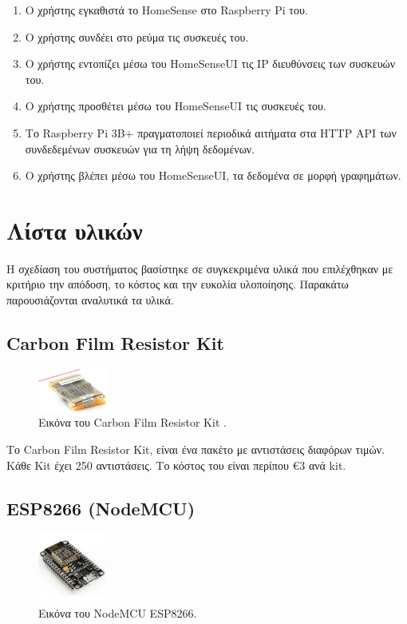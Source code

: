 \documentclass[conference]{IEEEtran}
\begin{document}
\begin{enumerate}
	\item Ο χρήστης εγκαθιστά το HomeSense στο Raspberry Pi του.
	\item Ο χρήστης συνδέει στο ρεύμα τις συσκευές του.
	\item Ο χρήστης εντοπίζει μέσω του HomeSenseUI τις IP διευθύνσεις των συσκευών του.
	\item Ο χρήστης προσθέτει μέσω του HomeSenseUI τις συσκευές του.
	\item Το Raspberry Pi 3B+ πραγματοποιεί περιοδικά αιτήματα στα HTTP API των συνδεδεμένων συσκευών για τη λήψη δεδομένων.
	\item Ο χρήστης βλέπει μέσω του HomeSenseUI, τα δεδομένα σε μορφή γραφημάτων.
\end{enumerate}

\section{Λίστα υλικών}

Η σχεδίαση του συστήματος βασίστηκε σε συγκεκριμένα υλικά που επιλέχθηκαν με κριτήριο την απόδοση, το κόστος και την ευκολία υλοποίησης. Παρακάτω παρουσιάζονται αναλυτικά τα υλικά.

\subsection{Carbon Film Resistor Kit}

\begin{figure}[H]
	\centerline{\includegraphics[width=0.2\textwidth]{assets/resistorkit}}
	\caption{Εικόνα του Carbon Film Resistor Kit .}
	\label{Εικόνα του Carbon Film Resistor Kit .}
\end{figure}

Το Carbon Film Resistor Kit, είναι ένα πακέτο με αντιστάσεις διαφόρων τιμών. Κάθε Kit έχει 250 αντιστάσεις. Το κόστος του είναι περίπου €3 ανά kit. \cite{resistorkit}

\subsection{ESP8266 (NodeMCU)}

\begin{figure}[H]
	\centerline{\includegraphics[width=0.2\textwidth]{assets/nodemcu.jpg}}
	\caption{Εικόνα του NodeMCU ESP8266.}
	\label{Εικόνα του NodeMCU ESP8266.}
\end{figure}
\end{document}
